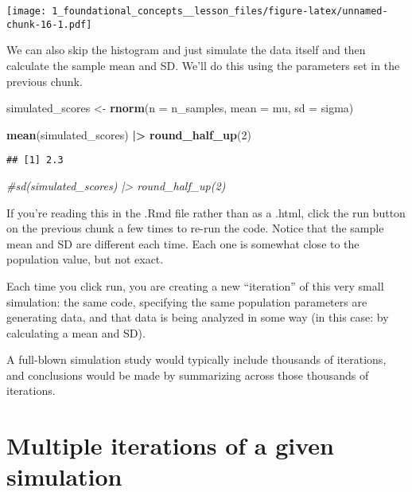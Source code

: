 \documentclass[
]{article}
\newenvironment{Shaded}{\begin{snugshade}}{\end{snugshade}}
\newcommand{\AttributeTok}[1]{\textcolor[rgb]{0.13,0.29,0.53}{#1}}
\newcommand{\CommentTok}[1]{\textcolor[rgb]{0.56,0.35,0.01}{\textit{#1}}}
\newcommand{\DecValTok}[1]{\textcolor[rgb]{0.00,0.00,0.81}{#1}}
\newcommand{\FunctionTok}[1]{\textcolor[rgb]{0.13,0.29,0.53}{\textbf{#1}}}
\newcommand{\NormalTok}[1]{#1}
\newcommand{\OtherTok}[1]{\textcolor[rgb]{0.56,0.35,0.01}{#1}}
\newcommand{\SpecialCharTok}[1]{\textcolor[rgb]{0.81,0.36,0.00}{\textbf{#1}}}
\begin{document}
\texttt{[image: 1\_foundational\_concepts\_\_lesson\_files/figure-latex/unnamed-chunk-16-1.pdf]}

We can also skip the histogram and just simulate the data itself and
then calculate the sample mean and SD. We'll do this using the
parameters set in the previous chunk.

\begin{Shaded}
\begin{Highlighting}[]
\NormalTok{simulated\_scores }\OtherTok{\textless{}{-}} 
    \FunctionTok{rnorm}\NormalTok{(}\AttributeTok{n =}\NormalTok{ n\_samples, }
          \AttributeTok{mean =}\NormalTok{ mu, }
          \AttributeTok{sd =}\NormalTok{ sigma) }

\FunctionTok{mean}\NormalTok{(simulated\_scores) }\SpecialCharTok{|\textgreater{}} \FunctionTok{round\_half\_up}\NormalTok{(}\DecValTok{2}\NormalTok{)}
\end{Highlighting}
\end{Shaded}

\begin{verbatim}
## [1] 2.3
\end{verbatim}

\begin{Shaded}
\begin{Highlighting}[]
\CommentTok{\#sd(simulated\_scores) |\textgreater{} round\_half\_up(2)}
\end{Highlighting}
\end{Shaded}

If you're reading this in the .Rmd file rather than as a .html, click
the run button on the previous chunk a few times to re-run the code.
Notice that the sample mean and SD are different each time. Each one is
somewhat close to the population value, but not exact.

Each time you click run, you are creating a new ``iteration'' of this
very small simulation: the same code, specifying the same population
parameters are generating data, and that data is being analyzed in some
way (in this case: by calculating a mean and SD).

A full-blown simulation study would typically include thousands of
iterations, and conclusions would be made by summarizing across those
thousands of iterations.

\hypertarget{multiple-iterations-of-a-given-simulation}{%
\section{Multiple iterations of a given
simulation}\label{multiple-iterations-of-a-given-simulation}}
\end{document}
